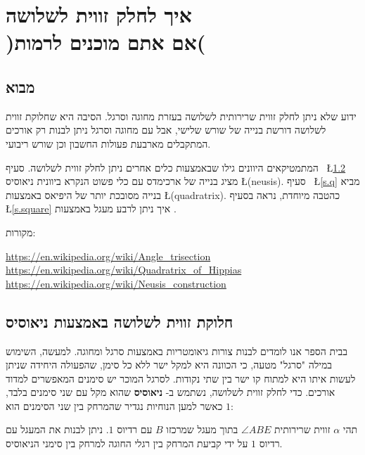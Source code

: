 
\chapter[\R{ איך לחלק זווית לשלושה )אם אתם מוכנים לרמות( }]%
{איך לחלק זווית לשלושה\\)אם אתם מוכנים לרמות(}
\label{c.trisect-an-angle}


\section{מבוא}

ידוע שלא ניתן לחלק זווית שרירותית לשלושה בעזרת מחוגה וסרגל. הסיבה היא שחלוקת זווית לשלושה דורשת בנייה של שורש שלישי, אבל עם מחוגה וסרגל ניתן לבנות רק אורכים המתקבלים מארבעת פעולות החשבון וכן שורש ריבועי.

המתמטיקאים היוונים גילו שבאמצעות כלים אחרים ניתן לחלק זווית לשלושה. סעיף~%
\L{\ref{s.neusis}}
מציג בנייה של ארכימדס עם כלי פשוט הנקרא ביוונית ניאוסיס
\L{(neusis)}.
סעיף~%
\L{\ref{s.q}}
מביא בנייה מסובכת יותר של היפיאס באמצעות
\qd{}
\L{(quadratrix)}.
כהטבה מיוחדת, נראה בסעיף~%
\L{\ref{s.square}}
איך ניתן לרבע מעגל באמצעות 
\qd{}.


מקורות:

\noindent\url{https://en.wikipedia.org/wiki/Angle_trisection}\\
\url{https://en.wikipedia.org/wiki/Quadratrix_of_Hippias}\\
\url{https://en.wikipedia.org/wiki/Neusis_construction}



\section{חלוקת זווית לשלושה באמצעות ניאוסיס}\label{s.neusis}

בבית הספר אנו לומדים לבנות צורות גיאומטריות באמצעות סרגל ומחוגה. למעשה, השימוש במילה "סרגל" מטעה, כי הכוונה היא למקל ישר ללא כל סימן, שהפעולה היחידה שניתן לעשות איתו היא למתוח קו ישר בין שתי נקודות. לסרגל המוכר יש סימנים המאפשרים למדוד אורכים. כדי לחלק זווית לשלושה, נשתמש ב-%
\textbf{ניאוסיס}
שהוא מקל עם שני סימנים בלבד, כאשר למען הנוחיות נגדיר שהמרחק בין שני הסימנים הוא
$1$:
\begin{center}
\end{center}
תהי 
$\alpha$
זווית שרירותית
$\angle ABE$
בתוך מעגל שמרכזו
$B$
עם רדיוס
$1$.
ניתן לבנות את המעגל עם רדיוס
$1$
על ידי קביעת המרחק בין רגלי החוגה למרחק בין סימני הניאוסיס.

